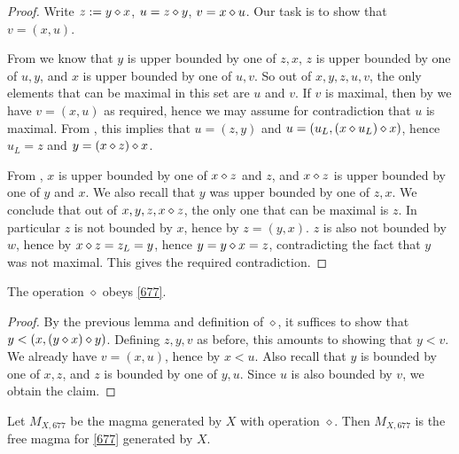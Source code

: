 \begin{proof} Write $z := y \diamond x$, $u = z \diamond y$, $v = x \diamond u$.  Our task is to show that $v = (x,u)$.

From  we know that $y$ is upper bounded by one of $z,x$, $z$ is upper bounded by one of $u,y$, and $x$ is upper bounded by one of $u,v$.  So out of $x,y,z,u,v$, the only elements that can be maximal in this set are $u$ and $v$.  If $v$ is maximal, then by  we have $v = (x,u)$ as required, hence we may assume for contradiction that $u$ is maximal.  From , this implies that $u = (z,y)$ and $u = (u_L, (x \diamond u_L) \diamond x)$, hence $u_L = z$ and $y = (x \diamond z) \diamond x$.

From , $x$ is upper bounded by one of $x \diamond z$ and $z$, and $x \diamond z$ is upper bounded by one of $y$ and $x$.  We also recall that $y$ was upper bounded by one of $z,x$. We conclude that out of $x,y,z,x \diamond z$, the only one that can be maximal is $z$.  In particular $z$ is not bounded by $x$, hence by  $z = (y,x)$.  $z$ is also not bounded by $w$, hence by  $x \diamond z = z_L = y$, hence $y = y \diamond x = z$, contradicting the fact that $y$ was not maximal. This gives the required contradiction.
\end{proof}

\begin{corollary}\label{677-obey}  The operation $\diamond$ obeys \eqref{677}.
\end{corollary}

\begin{proof} By the previous lemma and definition of $\diamond$, it suffices to show that $y < (x, (y \diamond x) \diamond y)$.  Defining $z,y,v$ as before, this amounts to showing that $y < v$.  We already have $v = (x,u)$, hence by  $x < u$.  Also recall that $y$ is bounded by one of $x,z$, and $z$ is bounded by one of $y,u$.  Since $u$ is also bounded by $v$, we obtain the claim.
\end{proof}

\begin{corollary} Let $M_{X,677}$ be the magma generated by $X$ with operation $\diamond$.  Then $M_{X,677}$ is the free magma for \eqref{677} generated by $X$.
\end{corollary}

